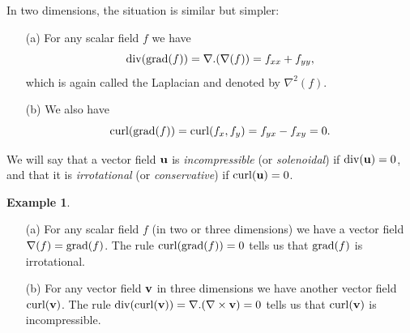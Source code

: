 \documentclass[reqno]{amsart}
\theoremstyle{definition}
\newtheorem{example}[theorem]{Example}
\begin{document}
In two dimensions, the situation is similar but simpler:
\begin{itemize}
 \item[(a)] For any scalar field $f$ we have 
  \[ \operatorname{div}(\operatorname{grad}(f))=\nabla.(\nabla(f))= f_{xx}+f_{yy}, \]
  which is again called the Laplacian and denoted by $\nabla^2(f)$.
 \item[(b)] We also have 
  \[ \operatorname{curl}(\operatorname{grad}(f)) = \operatorname{curl}(f_x,f_y) = f_{yx}-f_{xy} = 0. \]
\end{itemize}

We will say that a vector field $\mathbf{u}$ is \emph{incompressible} (or
\emph{solenoidal}) if $\operatorname{div}(\mathbf{u})=0$, and that it is
\emph{irrotational} (or \emph{conservative}) if $\operatorname{curl}(\mathbf{u})=0$.

\begin{example}
 \begin{itemize}
  \item[(a)] For any scalar field $f$ (in two or three dimensions) we
   have a vector field $\nabla(f)=\operatorname{grad}(f)$.  The rule
   $\operatorname{curl}(\operatorname{grad}(f))=0$ tells us that $\operatorname{grad}(f)$ is irrotational.
  \item[(b)] For any vector field $\mathbf{v}$ in three dimensions we have
   another vector field $\operatorname{curl}(\mathbf{v})$.  The rule
   $\operatorname{div}(\operatorname{curl}(\mathbf{v}))=\nabla.(\nabla\times\mathbf{v})=0$ tells us that 
   $\operatorname{curl}(\mathbf{v})$ is incompressible.
 \end{itemize}
\end{example}
\end{document}

